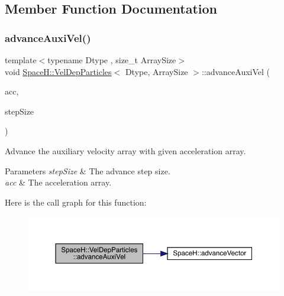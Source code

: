 \subsection{Member Function Documentation}
\mbox{\label{class_space_h_1_1_vel_dep_particles_ad69e66caccfba5582be350169f8de895}} 
\subsubsection{\texorpdfstring{advance\+Auxi\+Vel()}{advanceAuxiVel()}}
{\footnotesize\ttfamily template$<$typename Dtype , size\+\_\+t Array\+Size$>$ \\
void \mbox{\hyperlink{class_space_h_1_1_vel_dep_particles}{Space\+H\+::\+Vel\+Dep\+Particles}}$<$ Dtype, Array\+Size $>$\+::advance\+Auxi\+Vel (\begin{DoxyParamCaption}\item[{const \mbox{\hyperlink{class_space_h_1_1_vel_indep_particles_aa9983058940249df8b00fa800e8cbad2}{Vector\+Array}} \&}]{acc,  }\item[{\mbox{\hyperlink{class_space_h_1_1_vel_indep_particles_aeb47d8131b30ed790320ff634f0d6af1}{Scalar}}}]{step\+Size }\end{DoxyParamCaption})\hspace{0.3cm}{\ttfamily [inline]}}



Advance the auxiliary velocity array with given acceleration array. 


\begin{DoxyParams}{Parameters}
{\em step\+Size} & The advance step size. \\
\hline
{\em acc} & The acceleration array. \\
\hline
\end{DoxyParams}
Here is the call graph for this function\+:
\nopagebreak
\begin{figure}[H]
\begin{center}
\leavevmode
\includegraphics[width=350pt]{class_space_h_1_1_vel_dep_particles_ad69e66caccfba5582be350169f8de895_cgraph}
\end{center}
\end{figure}
\mbox{\label{class_space_h_1_1_vel_dep_particles_a345c6bc4002525f79ae0cfb5232f35df}} 
